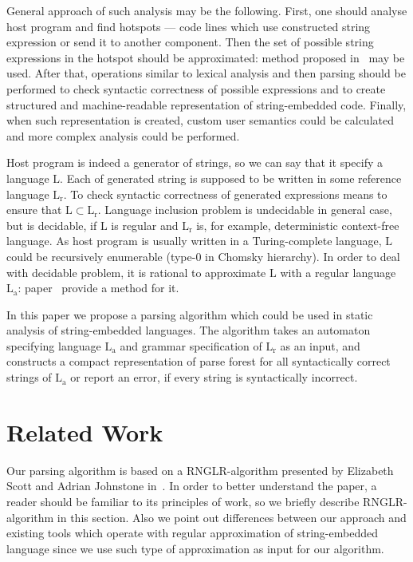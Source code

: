 \documentclass{llncs}
\begin{document}
General approach of such analysis may be the following. First, one should analyse 
host program and find hotspots — code lines which use constructed string expression 
or send it to another component. Then the set of possible string expressions in 
the hotspot should be approximated: method proposed in~\cite{Stranger} may be used. After that, 
operations similar to lexical analysis and then parsing should be performed to check 
syntactic correctness of possible expressions and to create structured and 
machine-readable representation of string-embedded code. Finally, when such 
representation is created, custom user semantics could be calculated and more 
complex analysis could be performed. 

Host program is indeed a generator of strings, so we can say that it specify a 
language $\mathrm{L}$. Each of generated string is supposed to be written in some 
reference language $\mathrm{L_r}$. To check syntactic correctness of generated 
expressions means to ensure that $\mathrm{L} \subset \mathrm{L_r}$. Language 
inclusion problem is undecidable in general case, but is decidable, if $\mathrm{L}$ 
is regular and $\mathrm{L_r}$ is, for example, deterministic context-free language. 
As host program is usually written in a Turing-complete language, $\mathrm{L}$ 
could be recursively enumerable (type-0 in Chomsky hierarchy). In order to deal 
with decidable problem, it is rational to approximate $\mathrm{L}$ with a regular 
language $\mathrm{L_a}$: paper~\cite{Stranger}  provide a method for it. 

In this paper we propose a parsing algorithm which could be used in static analysis 
of string-embedded languages. The algorithm takes an automaton specifying language 
$\mathrm{L_a}$ and grammar specification of $\mathrm{L_r}$ as an input, and constructs 
a compact representation of parse forest for all syntactically correct strings of 
$\mathrm{L_a}$ or report an error, if every string is syntactically incorrect. 

\section{Related Work}
Our parsing algorithm is based on a RNGLR-algorithm presented by Elizabeth Scott 
and Adrian Johnstone in~\cite{RNGLR}. In order to better understand the paper, a reader 
should be familiar to its principles of work, so we briefly describe RNGLR-algorithm 
in this section.  Also we point out differences between our approach and existing
tools which operate with regular approximation of string-embedded language since
we use such type of approximation as input for our algorithm.
\end{document}
